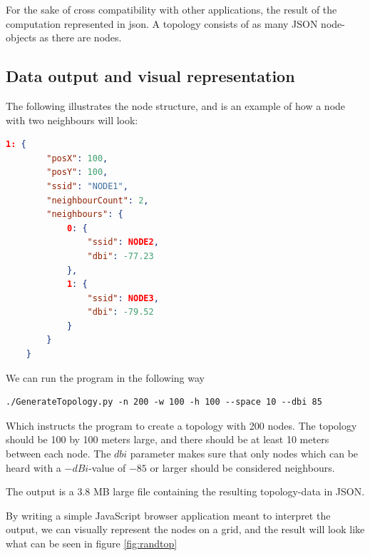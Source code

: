 \documentclass[a4paper,UKenglish]{report}
\begin{document}
For the sake of cross compatibility with other applications, the result of the computation represented in json. A topology consists of as
many JSON node-objects as there are nodes.


\subsection{Data output and visual representation}
The following illustrates the node structure, and is an example of how a node with two neighbours will look: 

\begin{minipage}{\linewidth}
	\begin{lstlisting}[language=json]
	1: {
		"posX": 100,
		"posY": 100, 
		"ssid": "NODE1",
		"neighbourCount": 2, 
		"neighbours": {
			0: {
				"ssid": NODE2,
				"dbi": -77.23
			},
			1: {
				"ssid": NODE3,
				"dbi": -79.52
			}
		}
	}
	\end{lstlisting}
\end{minipage}

We can run the program in the following way
\begin{verbatim}./GenerateTopology.py -n 200 -w 100 -h 100 --space 10 --dbi 85 \end{verbatim}
Which instructs the program to create a topology with 200 nodes. 
The topology should be 100 by 100 meters large, and there should be at least 10 meters
between each node. The $dbi$ parameter makes sure that only nodes which can be
heard with a $-dBi$-value of $-85$ or larger should be considered neighbours.

The output is a 3.8 MB large file containing the resulting topology-data in JSON.

By writing a simple JavaScript browser application meant to interpret the output, we can
visually represent the nodes on a grid, and the result will look like what can be seen in figure \ref{fig:randtop}
\end{document}
